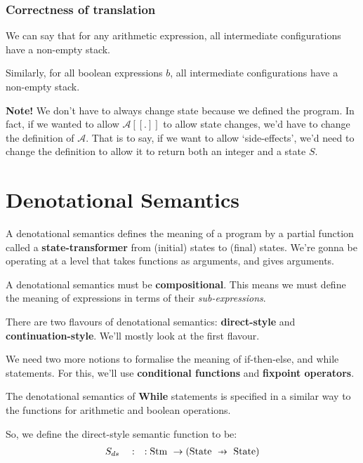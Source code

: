 \documentclass[11pt,a4paper,titlepage,dvipsnames,cmyk]{scrartcl}
\newcommand\pfun{\mathrel{\ooalign{\hfil$\mapstochar\mkern5mu$\hfil\cr$\to$\cr}}}
\begin{document}
\subsubsection{Correctness of translation}%
\label{ssub:correctness-translation}
We can say that for any arithmetic expression, all intermediate
configurations have a non-empty stack. 

Similarly, for all boolean expressions $b$, all intermediate
configurations have a non-empty stack.

\textbf{Note!} We don't have to always change state because we defined the
program. In fact, if we wanted to allow $\mathcal{A}[\![.]\!]$ to allow
state changes, we'd have to change the definition of $\mathcal{A}$. That
is to say, if we want to allow `side-effects', we'd need to change the
definition to allow it to return both an integer and a state $S$.

\section{Denotational Semantics}%
\label{sec:denotational-semantics}
A denotational semantics defines the meaning of a program by a partial
function called a \textbf{state-transformer} from (initial) states to
(final) states. We're gonna be operating at a level that takes functions
as arguments, and gives arguments.

A denotational semantics must be \textbf{compositional}. This means we
must define the meaning of expressions in terms of their
\textit{sub-expressions}.

There are two flavours of denotational semantics: \textbf{direct-style}
and \textbf{continuation-style}. We'll mostly look at the first flavour.

We need two more notions to formalise the meaning of if-then-else, and
while statements. For this, we'll use \textbf{conditional functions} and
\textbf{fixpoint operators}.

The denotational semantics of \textbf{While} statements is specified in a
similar way to the functions for arithmetic and boolean operations.

So, we define the direct-style semantic function to be:
\begin{align*}
    S_{ds} \quad : \quad: \text{Stm } \rightarrow ( \text{State } \pfun
    \text{ State})
\end{align*}
\end{document}
